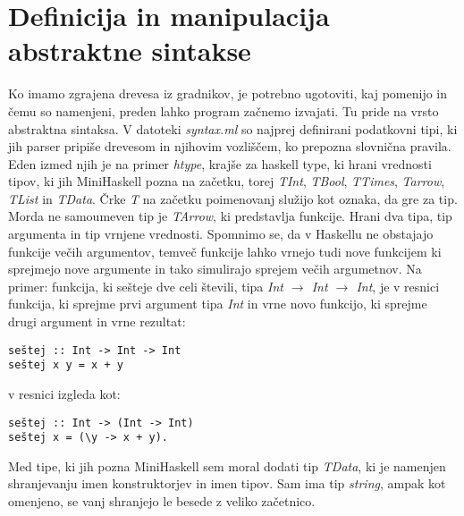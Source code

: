 \documentclass[12pt,a4paper,openany]{book}
\begin{document}
\section{Definicija in manipulacija abstraktne sintakse}
Ko imamo zgrajena drevesa iz gradnikov, je potrebno ugotoviti, kaj pomenijo in čemu so namenjeni, preden lahko program začnemo izvajati. Tu pride na vrsto abstraktna sintaksa. 
V datoteki \emph{syntax.ml} so najprej definirani podatkovni tipi, ki jih parser pripiše drevesom in njihovim vozliščem, ko prepozna slovnična pravila. Eden izmed njih je na primer 
\emph{htype}, krajše za haskell type, ki hrani vrednosti tipov, ki jih MiniHaskell pozna na začetku, torej \emph{TInt}, \emph{TBool}, \emph{TTimes}, \emph{Tarrow}, \emph{TList} in 
\emph{TData}. Črke \emph{T} na začetku poimenovanj služijo kot oznaka, da gre za tip. Morda ne samoumeven tip je \emph{TArrow}, ki predstavlja funkcije. Hrani dva tipa, tip argumenta
in tip vrnjene vrednosti. Spomnimo se, da v Haskellu ne obstajajo funkcije večih argumentov, temveč funkcije lahko vrnejo tudi nove funkcijem ki sprejmejo nove argumente in tako 
simulirajo sprejem večih argumetnov. Na primer: funkcija, ki sešteje dve celi števili, tipa \emph{Int $\rightarrow$ Int $\rightarrow$ Int}, je v resnici funkcija, ki sprejme prvi argument tipa \emph{Int}
in vrne novo funkcijo, ki sprejme drugi argument in vrne rezultat:
\begin{lstlisting}
seštej :: Int -> Int -> Int
seštej x y = x + y
\end{lstlisting}
v resnici izgleda kot:
\begin{lstlisting}
seštej :: Int -> (Int -> Int)
seštej x = (\y -> x + y).
\end{lstlisting}
Med tipe, ki jih pozna MiniHaskell sem moral dodati tip \emph{TData}, ki je namenjen shranjevanju imen konstruktorjev in imen tipov. Sam ima tip \emph{string}, ampak kot omenjeno, 
se vanj shranjejo le besede z veliko začetnico. 
\end{document}
